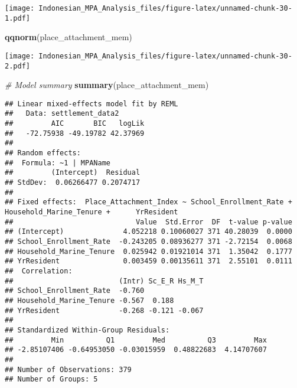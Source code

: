 \documentclass[
]{article}
\newenvironment{Shaded}{\begin{snugshade}}{\end{snugshade}}
\newcommand{\CommentTok}[1]{\textcolor[rgb]{0.56,0.35,0.01}{\textit{#1}}}
\newcommand{\FunctionTok}[1]{\textcolor[rgb]{0.13,0.29,0.53}{\textbf{#1}}}
\newcommand{\NormalTok}[1]{#1}
\begin{document}
\texttt{[image: Indonesian\_MPA\_Analysis\_files/figure-latex/unnamed-chunk-30-1.pdf]}

\begin{Shaded}
\begin{Highlighting}[]
\FunctionTok{qqnorm}\NormalTok{(place\_attachment\_mem)}
\end{Highlighting}
\end{Shaded}

\texttt{[image: Indonesian\_MPA\_Analysis\_files/figure-latex/unnamed-chunk-30-2.pdf]}

\begin{Shaded}
\begin{Highlighting}[]
\CommentTok{\# Model summary}
\FunctionTok{summary}\NormalTok{(place\_attachment\_mem)}
\end{Highlighting}
\end{Shaded}

\begin{verbatim}
## Linear mixed-effects model fit by REML
##   Data: settlement_data2 
##         AIC       BIC   logLik
##   -72.75938 -49.19782 42.37969
## 
## Random effects:
##  Formula: ~1 | MPAName
##         (Intercept)  Residual
## StdDev:  0.06266477 0.2074717
## 
## Fixed effects:  Place_Attachment_Index ~ School_Enrollment_Rate + Household_Marine_Tenure +      YrResident 
##                             Value  Std.Error  DF  t-value p-value
## (Intercept)              4.052218 0.10060027 371 40.28039  0.0000
## School_Enrollment_Rate  -0.243205 0.08936277 371 -2.72154  0.0068
## Household_Marine_Tenure  0.025942 0.01921014 371  1.35042  0.1777
## YrResident               0.003459 0.00135611 371  2.55101  0.0111
##  Correlation: 
##                         (Intr) Sc_E_R Hs_M_T
## School_Enrollment_Rate  -0.760              
## Household_Marine_Tenure -0.567  0.188       
## YrResident              -0.268 -0.121 -0.067
## 
## Standardized Within-Group Residuals:
##         Min          Q1         Med          Q3         Max 
## -2.85107406 -0.64953050 -0.03015959  0.48822683  4.14707607 
## 
## Number of Observations: 379
## Number of Groups: 5
\end{verbatim}
\end{document}
